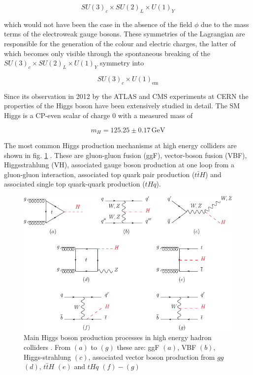 \begin{equation*}
	SU(3)_c \times SU(2)_L \times U(1)_Y
\end{equation*}

which would not have been the case in the absence of the field $\phi$ due to the mass terms of the electroweak gauge bosons. These symmetries of the Lagrangian are responsible for the generation of the colour and electric charges, the latter of which becomes only visible through the spontaneous breaking of the $SU(3)_c \times SU(2)_L \times U(1)_Y$ symmetry into

\begin{equation*}
	SU(3)_c \times U(1)_\text{em}
\end{equation*}

Since its observation in 2012 by the ATLAS and CMS experiments at CERN \cite{Chatrchyan_2012} the properties of the Higgs boson have been extensively studied in detail. The SM Higgs is a CP-even scalar of charge 0 with a measured mass of

\begin{equation*}
	m_H = 125.25 \pm 0.17 \, \text{GeV}
\end{equation*}

The most common Higgs production mechanisms at high energy colliders are shown in fig. \ref{fig:higgsproduction} \cite{Workman:2022ynf}. These are gluon-gluon fusion (ggF), vector-boson fusion (VBF), Higgsstrahlung (VH), associated gauge boson production at one loop from a gluon-gluon interaction, associated top quark pair production ($t\bar{t}H$) and associated single top quark-quark production ($tHq$).

\begin{figure}[h!]
	\centering
	\includegraphics[width=0.8\linewidth]{figures/theory/higgsproduction.pdf}
	\caption{Main Higgs boson production processes in high energy hadron colliders \cite{Workman:2022ynf}. From $(a)$ to $(g)$ these are: ggF $(a)$, VBF $(b)$, Higgs-strahlung $(c)$, associated vector boson production from $gg$ $(d)$, $t\bar{t}H$ $(e)$ and $tHq$ $(f)-(g)$}
	\label{fig:higgsproduction}
\end{figure}

